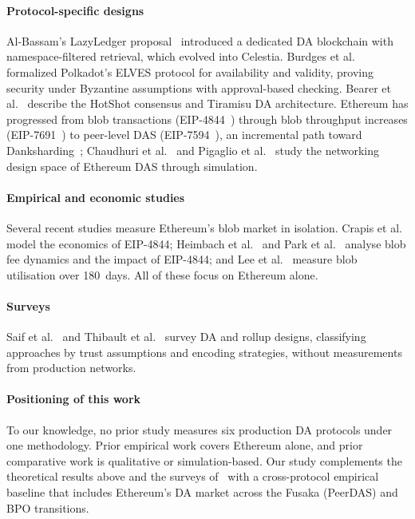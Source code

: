 \paragraph{Protocol-specific designs}
Al-Bassam's LazyLedger proposal~\cite{AlBassam_LazyLedger} introduced a dedicated DA blockchain with namespace-filtered retrieval, which evolved into Celestia.
Burdges et al.~\cite{Jeff_Burdges_ELVES} formalized Polkadot's ELVES protocol for availability and validity, proving security under Byzantine assumptions with approval-based checking.
Bearer et al.~\cite{Espresso:Hotshot_and_Triamisu} describe the HotShot consensus and Tiramisu DA architecture.
Ethereum has progressed from blob transactions (EIP-4844~\cite{EIP-4844}) through blob throughput increases (EIP-7691~\cite{EIP-7691}) to peer-level DAS (EIP-7594~\cite{EIP-7594}), an incremental path toward Danksharding~\cite{Buterin_Danksharding}; Chaudhuri et al.~\cite{CodexDAS} and Pigaglio et al.~\cite{Pigaglio2025PANDAS} study the networking design space of Ethereum DAS through simulation.

\paragraph{Empirical and economic studies}
Several recent studies measure Ethereum's blob market in isolation.
Crapis et al.~\cite{Crapis2024EIP4844Econ} model the economics of EIP-4844; Heimbach et al.~\cite{Heimbach2025BlobFee} and Park et al.~\cite{Park2026EIP4844Impact} analyse blob fee dynamics and the impact of EIP-4844; and Lee et al.~\cite{Lee2025BlobSharing} measure blob utilisation over 180~days.
All of these focus on Ethereum alone.

\paragraph{Surveys}
Saif et al.~\cite{Saif_Survey_DA_Rollups} and Thibault et al.~\cite{Thibault2022Rollups} survey DA and rollup designs, classifying approaches by trust assumptions and encoding strategies, without measurements from production networks.

\paragraph{Positioning of this work}
To our knowledge, no prior study measures six production DA protocols under one methodology.
Prior empirical work covers Ethereum alone, and prior comparative work is qualitative or simulation-based.
Our study complements the theoretical results above and the surveys of~\cite{Saif_Survey_DA_Rollups, Thibault2022Rollups} with a cross-protocol empirical baseline that includes Ethereum's DA market across the Fusaka (PeerDAS) and BPO transitions.
